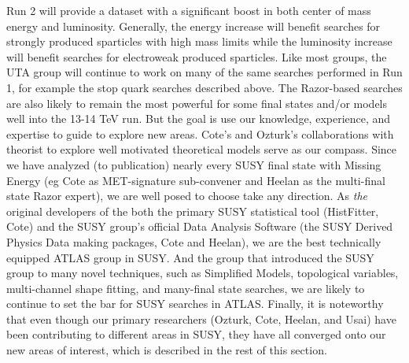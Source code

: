 Run 2 will provide a dataset with a significant boost in both center
of mass energy and luminosity. Generally, the energy increase will
benefit searches for strongly produced sparticles with high mass
limits while the luminosity increase will benefit searches for
electroweak produced sparticles.  Like most groups, the UTA group will
continue to work on many of the same searches performed in Run 1, for
example the stop quark searches described above. The Razor-based
searches are also likely to remain the most powerful for some final
states and/or models well into the 13-14 TeV run. But the goal is use
our knowledge, experience, and expertise to guide to explore new
areas. Cote's and Ozturk's collaborations with theorist to explore
well motivated theoretical models serve as our compass. Since we have
analyzed (to publication) nearly every SUSY final state with Missing
Energy (eg Cote as MET-signature sub-convener and Heelan as the
multi-final state Razor expert), we are well posed to choose take any
direction. As {\it the} original developers of the both the primary
SUSY statistical tool (HistFitter, Cote) and the SUSY group's official
Data Analysis Software (the SUSY Derived Physics Data making packages,
Cote and Heelan), we are the best technically equipped ATLAS group in
SUSY. And the group that introduced the SUSY group to many novel
techniques, such as Simplified Models, topological variables,
multi-channel shape fitting, and many-final state searches, we are
likely to continue to set the bar for SUSY searches in ATLAS. Finally,
it is noteworthy that even though our primary researchers (Ozturk,
Cote, Heelan, and Usai) have been contributing to different areas in
SUSY, they have all converged onto our new areas of interest, which is
described in the rest of this section.


